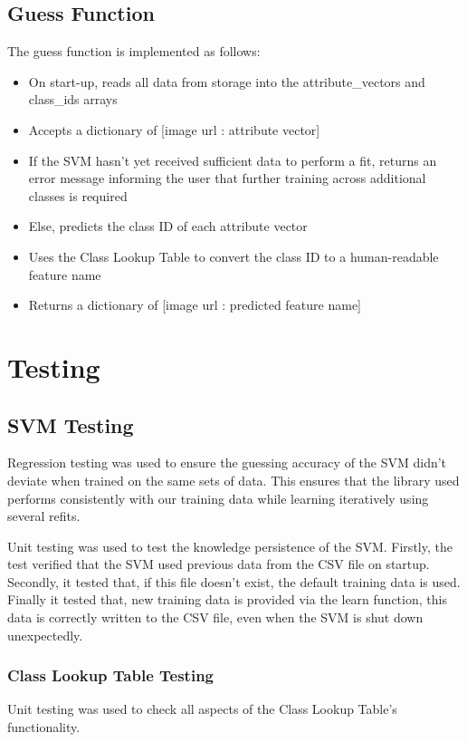 \subsection{Guess Function}
The guess function is implemented as follows:
\begin{itemize}
    \item On start-up, reads all data from storage into the attribute_vectors and class_ids arrays
    \item Accepts a dictionary of [image url : attribute vector]
    \item If the SVM hasn’t yet received sufficient data to perform a fit, returns an error message informing the user that further training across additional classes is required
    \item Else, predicts the class ID of each attribute vector
    \item Uses the Class Lookup Table to convert the class ID to a human-readable feature name
    \item Returns a dictionary of [image url : predicted feature name]
\end{itemize}

\section{Testing}
\subsection{SVM Testing}
Regression testing was used to ensure the guessing accuracy of the SVM didn’t deviate when trained on the same sets of data. This ensures that the library used performs consistently with our training data while learning iteratively using several refits.

Unit testing was used to test the knowledge persistence of the SVM. Firstly, the test verified that the SVM used previous data from the CSV file on startup. Secondly, it tested that, if this file doesn’t exist, the default training data is used. Finally it tested that, new training data is provided via the learn function, this data is correctly written to the CSV file, even when the SVM is shut down unexpectedly.
\subsubsection{Class Lookup Table Testing}
Unit testing was used to check all aspects of the Class Lookup Table’s functionality.


